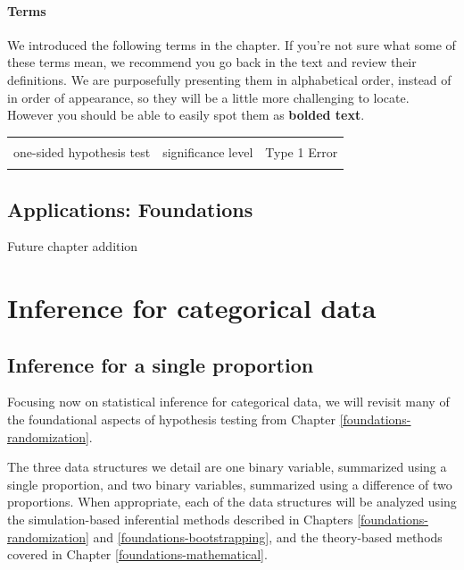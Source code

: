 \documentclass[
  10pt,
  openany]{book}
\theoremstyle{definition}
\theoremstyle{definition}
\theoremstyle{definition}
\theoremstyle{definition}
\theoremstyle{remark}
\begin{document}
\subsection*{Terms}\label{terms-10}

We introduced the following terms in the chapter. If you're not sure what some of these terms mean, we recommend you go back in the text and review their definitions. We are purposefully presenting them in alphabetical order, instead of in order of appearance, so they will be a little more challenging to locate. However you should be able to easily spot them as \textbf{bolded text}.

\begin{tabu} to 
\toprule
{} &  & \\
one-sided hypothesis test & significance level & Type 1 Error\\
 &  & \\
\bottomrule
\end{tabu}

\chapter{Applications: Foundations}\label{foundations-applications}

Future chapter addition

\part{Inference for categorical data}\label{part-inference-for-categorical-data}

\chapter{Inference for a single proportion}\label{inference-one-prop}

Focusing now on statistical inference for categorical data, we will revisit many of the foundational aspects of hypothesis testing from Chapter \ref{foundations-randomization}.

The three data structures we detail are one binary variable, summarized using a single proportion, and two binary variables, summarized using a difference of two proportions.
When appropriate, each of the data structures will be analyzed using the simulation-based inferential methods described in Chapters \ref{foundations-randomization} and \ref{foundations-bootstrapping}, and the theory-based methods covered in Chapter \ref{foundations-mathematical}.
\end{document}

